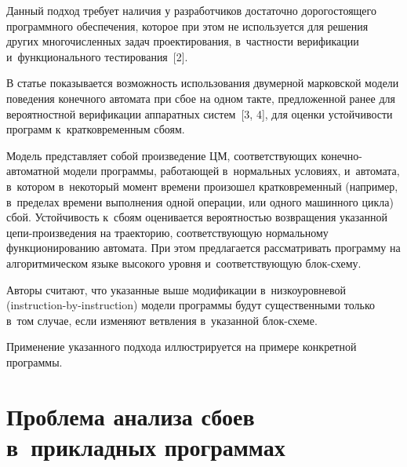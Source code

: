 \begin{multicols}{2}
     Данный подход требует наличия у разработчиков достаточно 
дорогостоящего программного обеспечения, которое при этом не используется 
для решения других многочисленных задач проектирования, в~част\-ности 
верификации и~функционального тестирования~[2]. 
     
     В статье показывается возможность использования двумерной 
марковской модели поведения конечного автомата при сбое на одном такте, 
предложенной ранее для вероятностной верификации аппаратных  
сис\-тем~[3, 4], для оценки устойчивости программ к~кратковременным сбоям.
     
     Модель представляет собой произведение ЦМ, 
соответствующих конечно-автоматной модели программы, работающей 
в~нормальных условиях, и~автомата, в~котором в~некоторый момент времени 
произошел кратковременный (например, в~пределах времени выполнения 
одной операции, или одного машинного цикла) сбой. Устойчивость к~сбоям 
оценивается вероятностью возвращения указанной це\-пи-про\-из\-ве\-де\-ния 
на траекторию, соответствующую нормальному функционированию автомата. 
     При этом предлагается рассматривать программу на алгоритмическом 
языке высокого уровня и~соответствующую блок-схему. 

Авторы считают, что 
указанные выше модификации в~низкоуровневой (instruction-by-instruction) 
модели программы будут существенными только в~том случае, если изменяют 
ветвления в~указанной блок-схеме. 
     
     Применение указанного подхода иллюстрируется на примере конкретной 
программы. 

\section{Проблема анализа сбоев в~прикладных программах}


\end{multicols}
